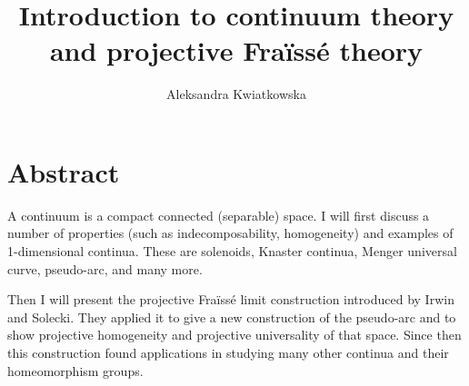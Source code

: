 \documentclass[11pt]{amsart}
\title{Introduction to continuum theory and projective Fra\"{i}ss\'e theory}
\author{Aleksandra Kwiatkowska}
\begin{document}
\maketitle
\section*{Abstract}



A continuum is a compact connected (separable) space. I will first discuss a number of properties (such as indecomposability, homogeneity) and examples of 1-dimensional continua. These are solenoids, Knaster continua, Menger universal curve, pseudo-arc, and many more.

Then I will present the projective Fra\"{i}ss\'e limit construction introduced by Irwin and Solecki. They applied it to give a new construction of the pseudo-arc and to show projective homogeneity and projective universality of that space. Since then this construction found applications in studying many other continua and their homeomorphism groups.
\end{document}
